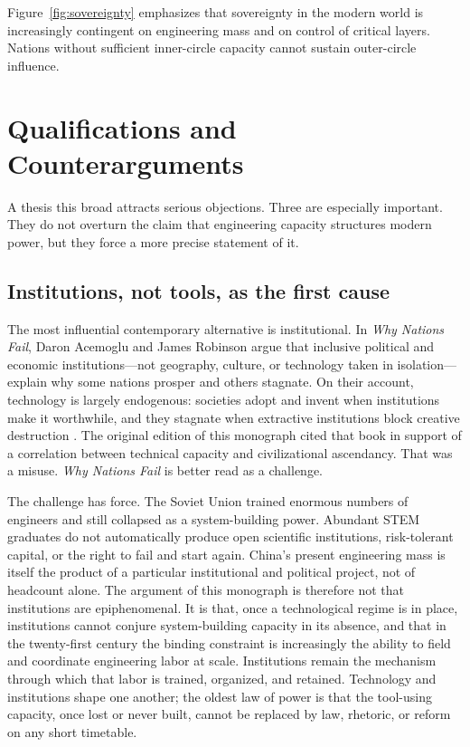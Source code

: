 \documentclass[12pt,letterpaper]{article}
\begin{document}
Figure~\ref{fig:sovereignty} emphasizes that sovereignty in the modern world is increasingly contingent on engineering mass and on control of critical layers. Nations without sufficient inner-circle capacity cannot sustain outer-circle influence.

\FloatBarrier

\section{Qualifications and Counterarguments}
\label{sec:counter}

A thesis this broad attracts serious objections. Three are especially important. They do not overturn the claim that engineering capacity structures modern power, but they force a more precise statement of it.

\subsection{Institutions, not tools, as the first cause}

The most influential contemporary alternative is institutional. In \textit{Why Nations Fail}, Daron Acemoglu and James Robinson argue that inclusive political and economic institutions---not geography, culture, or technology taken in isolation---explain why some nations prosper and others stagnate. On their account, technology is largely endogenous: societies adopt and invent when institutions make it worthwhile, and they stagnate when extractive institutions block creative destruction \cite{acemoglu2012}. The original edition of this monograph cited that book in support of a correlation between technical capacity and civilizational ascendancy. That was a misuse. \textit{Why Nations Fail} is better read as a challenge.

The challenge has force. The Soviet Union trained enormous numbers of engineers and still collapsed as a system-building power. Abundant STEM graduates do not automatically produce open scientific institutions, risk-tolerant capital, or the right to fail and start again. China's present engineering mass is itself the product of a particular institutional and political project, not of headcount alone. The argument of this monograph is therefore not that institutions are epiphenomenal. It is that, once a technological regime is in place, institutions cannot conjure system-building capacity in its absence, and that in the twenty-first century the binding constraint is increasingly the ability to field and coordinate engineering labor at scale. Institutions remain the mechanism through which that labor is trained, organized, and retained. Technology and institutions shape one another; the oldest law of power is that the tool-using capacity, once lost or never built, cannot be replaced by law, rhetoric, or reform on any short timetable.
\end{document}
